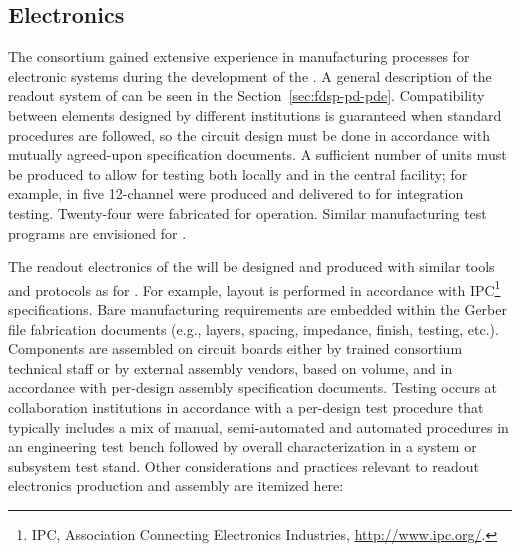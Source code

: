 \subsection{Electronics}
\label{sec:fdsp-pd-assy-pde}

The  consortium gained extensive experience in manufacturing processes for electronic systems during the development of the  .
A general description of the readout system of  can be seen in the Section~\ref{sec:fdsp-pd-pde}. Compatibility between elements designed by different institutions is guaranteed when standard procedures are followed, so the circuit design must be done in accordance with mutually agreed-upon specification documents.  A sufficient  number of units must be produced to allow %
for testing both locally and  in the central facility; for example, in  five 12-channel   were produced and delivered to  for integration testing. Twenty-four were fabricated for  operation. Similar manufacturing test programs are envisioned for .

The readout electronics of the  will be designed and produced with similar tools and protocols as for  . For example, %
 layout is performed in accordance with IPC\footnote{IPC\texttrademark{}, Association Connecting Electronics Industries, \url{http://www.ipc.org/}.} specifications. Bare  manufacturing requirements are embedded within the Gerber file 
fabrication documents (e.g., layers, spacing, impedance, finish, testing, etc.). Components are assembled on circuit boards either by trained  consortium technical staff or by external assembly vendors, based on volume, and in accordance with per-design assembly specification documents. Testing occurs at %
collaboration institutions in accordance with a per-design test procedure that typically includes a mix of manual, semi-automated and automated procedures %
in an engineering test bench followed by overall characterization in a system or subsystem test stand.
Other considerations and practices relevant to readout electronics production and assembly are itemized here:

